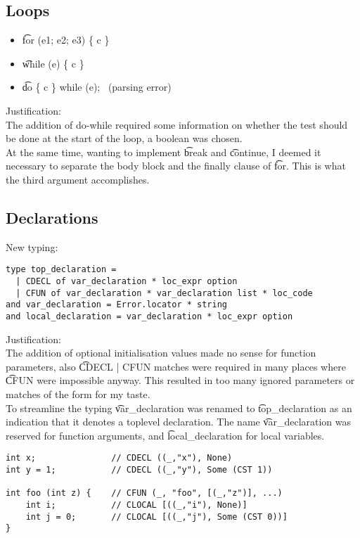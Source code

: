 \subsection{Loops}
\begin{itemize}
    \item \t{for (e1; e2; e3) \{ c \}}
    \not\to\ 
    \to\ 
    \item \t{while (e) \{ c \}}
    \not\to\ 
    \to\ 
    \item \t{do \{ c \} while (e);}
    \not\to\ (parsing error)
    \to\ 
\end{itemize}
Justification:\\
The addition of do-while required some information on whether the test should be done at the start of the loop, a boolean was chosen.\\
At the same time, wanting to implement \t{break} and \t{continue}, I deemed it necessary to separate the body block and the finally clause of \t{for}. This is what the third argument accomplishes.

\subsection{Declarations}
New typing:
\begin{verbatim}
type top_declaration =
  | CDECL of var_declaration * loc_expr option
  | CFUN of var_declaration * var_declaration list * loc_code
and var_declaration = Error.locator * string
and local_declaration = var_declaration * loc_expr option
\end{verbatim}

Justification:\\
The addition of optional initialisation values made no sense for function parameters, also \t{CDECL | CFUN} matches were required in many places where \t{CFUN} were impossible anyway. This resulted in too many ignored parameters or matches of the form  for my taste.\\
To streamline the typing \t{var\_declaration} was renamed to \t{top\_declaration} as an indication that it denotes a toplevel declaration. The name \t{var\_declaration} was reserved for function arguments, and \t{local\_declaration} for local variables.

\begin{verbatim}
int x;               // CDECL ((_,"x"), None)
int y = 1;           // CDECL ((_,"y"), Some (CST 1))

int foo (int z) {    // CFUN (_, "foo", [(_,"z")], ...)
    int i;           // CLOCAL [((_,"i"), None)]
    int j = 0;       // CLOCAL [((_,"j"), Some (CST 0))]
}
\end{verbatim}
